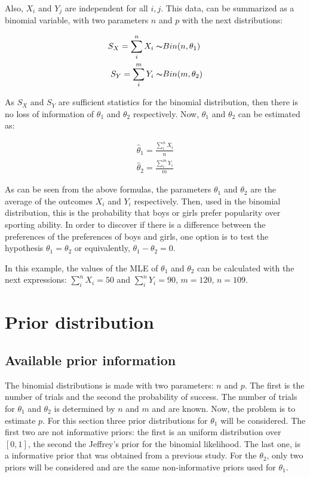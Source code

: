 \documentclass{article}
\begin{document}
Also, $X_i$ and $Y_j$ are independent for all $i, j$. This data, can be summarized as a binomial variable, with two parameters $n$ and $p$ with the next distributions:

\begin{equation}
\begin{split}
S_X = \sum_i^n X_i  \thicksim&  Bin(n, \theta_1) \\
S_Y = \sum_i^m Y_i  \thicksim&  Bin(m, \theta_2) \\
\end{split}
\end{equation}

As $S_X$ and $S_Y$ are sufficient statistics for the binomial distribution, then there is no loss of information of $\theta_1$ and $\theta_2$ respectively. Now, $\theta_1$ and $\theta_2$ can be estimated as:

\begin{equation}
\begin{split}
\widehat{\theta}_1 = \frac{\sum_i^n X_i}{n}\\
\widehat{\theta}_2 = \frac{\sum_i^m Y_i}{m}
\end{split}
\end{equation}

As can be seen from the above formulas, the parameters $\theta_1$ and $\theta_2$ are the average of the outcomes $X_i$ and $Y_i$ respectively. Then, used in the binomial distribution, this is the probability that boys or girls prefer popularity over sporting ability. In order to discover if there is a difference between the preferences of the preferences of boys and girls, one option is to test the hypothesis $\theta_1 = \theta_2$ or equivalently, $\theta_1 - \theta_2 = 0$.

In this example, the values of the MLE of $\theta_1$ and $\theta_2$ can be calculated with the next expressions: $\sum_i^n X_i = 50$ and $\sum_i^n Y_i = 90$, $m = 120$, $n = 109$. 

\section{Prior distribution}	
\subsection{Available prior information}

The binomial distributions is made with two parameters: $n$ and $p$. The first is the number of trials and the second the probability of success. The number of trials for $\theta_1$ and $\theta_2$ is determined by $n$ and $m$ and are known. Now, the problem is to estimate $p$. For this section three prior distributions for $\theta_1$ will be considered. The first two are not informative priors: the first is an uniform distribution over $[0,1]$, the second the Jeffrey's prior for the binomial likelihood. The last one, is a informative prior that was obtained from a previous study. For the $\theta_2$, only two priors will be considered and are the same non-informative priors used for $\theta_1$. 
\end{document}

